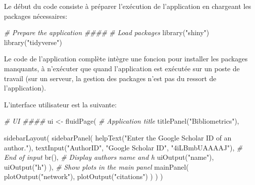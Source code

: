 \documentclass[
  11pt,
  french,
  a4paper,
  extrafontsizes,onecolumn,openright
  ]{memoir}
\newenvironment{Shaded}{\begin{snugshade}}{\end{snugshade}}
\newcommand{\CommentTok}[1]{\textcolor[rgb]{0.56,0.35,0.01}{\textit{#1}}}
\newcommand{\FunctionTok}[1]{\textcolor[rgb]{0.00,0.00,0.00}{#1}}
\newcommand{\NormalTok}[1]{#1}
\newcommand{\OtherTok}[1]{\textcolor[rgb]{0.56,0.35,0.01}{#1}}
\newcommand{\StringTok}[1]{\textcolor[rgb]{0.31,0.60,0.02}{#1}}
\begin{document}
Le début du code consiste à préparer l'exécution de l'application en chargeant les packages nécessaires:

\scriptsize

\begin{Shaded}
\begin{Highlighting}[]
\CommentTok{\# Prepare the application \#\#\#\#}
\CommentTok{\# Load packages}
\FunctionTok{library}\NormalTok{(}\StringTok{"shiny"}\NormalTok{)}
\FunctionTok{library}\NormalTok{(}\StringTok{"tidyverse"}\NormalTok{)}
\end{Highlighting}
\end{Shaded}

\normalsize

Le code de l'application complète intègre une foncion pour installer les packages manquants, à n'exécuter que quand l'application est exécutée sur un poste de travail (sur un serveur, la gestion des packages n'est pas du ressort de l'application).

L'interface utilisateur est la suivante:

\scriptsize

\begin{Shaded}
\begin{Highlighting}[]
\CommentTok{\# UI \#\#\#\#}
\NormalTok{ui }\OtherTok{\textless{}{-}} \FunctionTok{fluidPage}\NormalTok{(}
  \CommentTok{\# Application title}
  \FunctionTok{titlePanel}\NormalTok{(}\StringTok{"Bibliometrics"}\NormalTok{),}
  
  \FunctionTok{sidebarLayout}\NormalTok{(}
    \FunctionTok{sidebarPanel}\NormalTok{(}
      \FunctionTok{helpText}\NormalTok{(}\StringTok{"Enter the Google Scholar ID of an author."}\NormalTok{),}
      \FunctionTok{textInput}\NormalTok{(}\StringTok{"AuthorID"}\NormalTok{, }\StringTok{"Google Scholar ID"}\NormalTok{, }\StringTok{"4iLBmbUAAAAJ"}\NormalTok{),}
      \CommentTok{\# End of input}
      \FunctionTok{br}\NormalTok{(),}
      \CommentTok{\# Display author\textquotesingle{}s name and h}
      \FunctionTok{uiOutput}\NormalTok{(}\StringTok{"name"}\NormalTok{),}
      \FunctionTok{uiOutput}\NormalTok{(}\StringTok{"h"}\NormalTok{)}
\NormalTok{    ),}
    \CommentTok{\# Show plots in the main panel}
    \FunctionTok{mainPanel}\NormalTok{(}
      \FunctionTok{plotOutput}\NormalTok{(}\StringTok{"network"}\NormalTok{),}
      \FunctionTok{plotOutput}\NormalTok{(}\StringTok{"citations"}\NormalTok{)}
\NormalTok{    )}
\NormalTok{  )}
\NormalTok{)}
\end{Highlighting}
\end{Shaded}
\end{document}
